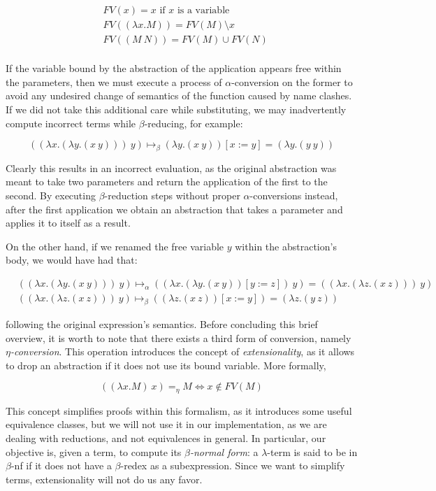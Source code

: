 \documentclass{article}
\begin{document}
\begin{align*}
    &FV(x) = x \text{ if } x \text{ is a variable}\\
    &FV((\lambda x . M)) = FV(M) \setminus x\\
    &FV((M\ N)) = FV(M) \cup FV(N)\\
\end{align*}

If the variable bound by the abstraction of the application appears free within the parameters, then we must execute a process of $\alpha$-conversion on the former to avoid any undesired change of semantics of the function caused by name clashes. If we did not take this additional care while substituting, we may inadvertently compute incorrect terms while $\beta$-reducing, for example:

$$((\lambda x. (\lambda y.(x\ y)))\ y) \mapsto_\beta (\lambda y . (x \ y))[x:=y] = (\lambda y . (y \ y))$$

Clearly this results in an incorrect evaluation, as the original abstraction was meant to take two parameters and return the application of the first to the second. By executing $\beta$-reduction steps without proper $\alpha$-conversions instead, after the first application we obtain an abstraction that takes a parameter and applies it to itself as a result.

On the other hand, if we renamed the free variable $y$ within the abstraction's body, we would have had that:

\begin{align*}
    &((\lambda x . (\lambda y . (x\ y)))\ y) \mapsto_\alpha ((\lambda x . (\lambda y . (x\ y))[y:=z])\ y) = ((\lambda x . (\lambda z . (x\ z)))\ y)\\
    &((\lambda x . (\lambda z . (x\ z)))\ y) \mapsto_\beta ((\lambda z . (x\ z))[x:=y]) = (\lambda z . (y\ z))
\end{align*}

\noindent following the original expression's semantics. Before concluding this brief overview, it is worth to note that there exists a third form of conversion, namely \textit{$\eta$-conversion}. This operation introduces the concept of \textit{extensionality}, as it allows to drop an abstraction if it does not use its bound variable. More formally,

$$((\lambda x.M)\ x) =_\eta M \iff x \not \in FV(M)$$

This concept simplifies proofs within this formalism, as it introduces some useful equivalence classes, but we will not use it in our implementation, as we are dealing with reductions, and not equivalences in general. In particular, our objective is, given a term, to compute its \textit{$\beta$-normal form}: a $\lambda$-term is said to be in $\beta$-nf if it does not have a $\beta$-redex as a subexpression. Since we want to simplify terms, extensionality will not do us any favor.
\end{document}
